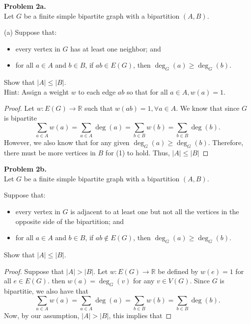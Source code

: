 \documentclass{article}
\newcommand{\R}{\mathbb{R}}
\newenvironment{hwproof}[2]
{
    \textbf{Problem #1.}\\
    #2
    \begin{proof}
}{
    \end{proof}
    \newpage
}
\begin{document}
\begin{hwproof}
    {2a}
    {
        Let $G$ be a finite simple bipartite graph with a bipartition $(A, B)$.

        (a) Suppose that:
        \begin{itemize}
            \item every vertex in $G$ has at least one neighbor; and
            \item for all $a \in A$ and $b \in B$, if $ab \in E(G)$, then
                  $\deg_G(a) \geq \deg_G(b)$.
        \end{itemize}
        Show that $|A| \leq |B|$.\\
        Hint: Assign a weight $w$ to each edge $ab$ so that for all $a \in A, w(a) = 1$.
    }
    Let $w: E(G) \to \R$ such that $w(ab) = 1, \forall a \in A$. We know that since $G$
    is bipartite
    \begin{equation}
        \sum_{a \in A} w(a) = \sum_{a \in A} \deg(a) = \sum_{b \in B} w(b) = \sum_{b \in B} \deg(b).
    \end{equation}
    However, we also
    know that for any given $\deg_G(a) \geq \deg_G(b)$.
    Therefore, there must be more vertices in $B$ for (1) to hold.
    Thus, $|A| \leq |B|$
\end{hwproof}

\begin{hwproof}
    {2b}
    {
        Let $G$ be a finite simple bipartite graph with a bipartition $(A, B)$.

        Suppose that:
        \begin{itemize}
            \item every vertex in $G$ is adjacent to at least one but not all the vertices in the
                  opposite side of the bipartition; and
            \item  for all $a \in A$ and $b \in B$, if $ab \not \in E(G)$, then
                  $\deg_G(a) \geq \deg_G(b)$.
        \end{itemize}
        Show that $|A| \leq |B|$.
    }
    Suppose that $|A| > |B|$. Let $w: E(G) \to \R$ be defined by
    $w(e) = 1$ for all $e \in E(G)$. then $w(a) = \deg_G(v)$ for any $v \in V(G)$.
    Since $G$ is bipartitie, we also have that
    \begin{equation}
        \sum_{a \in A} w(a) = \sum_{a \in A} \deg(a) = \sum_{b \in B} w(b) = \sum_{b \in B} \deg(b).
    \end{equation}
    Now, by our assumption, $|A| > |B|$, this implies that

\end{hwproof}
\end{document}
